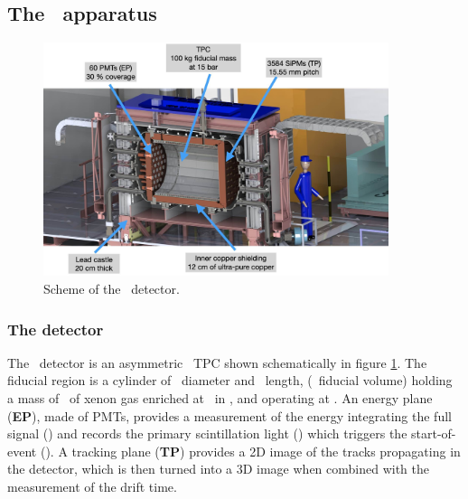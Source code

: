 \subsection{The \Next\ apparatus}
\label{sec.next100}

\begin{figure}[htbp!]
\centering
\includegraphics[width=0.9\textwidth]{img2/NEXT-100-description.jpg}
\caption{\small Scheme of the \NEXT\ detector.}
\label{fig.next-100}
\end{figure}

\subsubsection{The detector}

The \Next\ detector is an asymmetric \HPXeEL\ TPC shown schematically in figure \ref{fig.next-100}.  The fiducial region is a cylinder of \NextTpcDiameter\ diameter and \NextTpcLength\ length, (\NextFiducialVolume\ fiducial volume) holding a mass of \NextFiducialMass\ of xenon gas enriched at \XeEnrichment\ in \XE, and operating at \NextPressure.  An energy plane ({\bf EP}),
made of PMTs, provides a measurement of the energy integrating the full signal (\stwo) and records the primary scintillation light (\sone) which triggers the start-of-event (\tz). A tracking plane ({\bf TP}) provides a 2D image of the tracks propagating in the detector, which is then turned into a 3D image when combined with the measurement of the drift time.  

\indent

